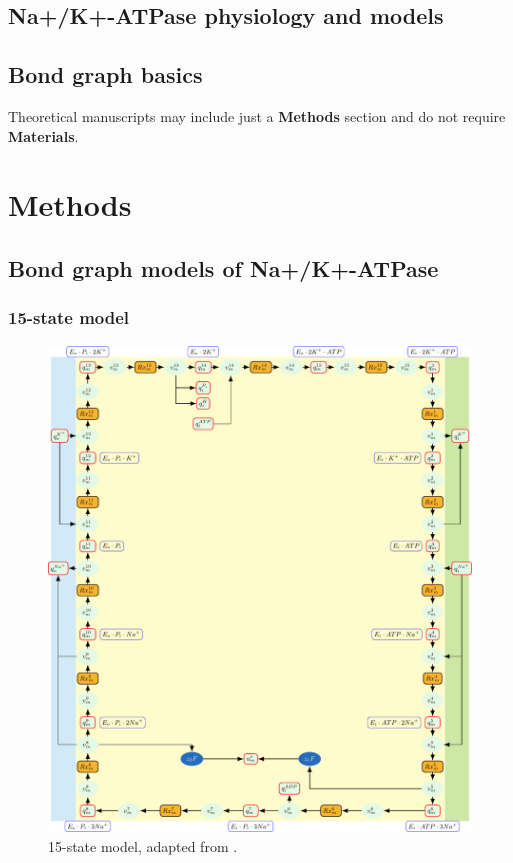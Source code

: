\documentclass{biophys-new}
\begin{document}
\subsection*{Na+/K+-ATPase physiology and models}


\subsection*{Bond graph basics}

Theoretical manuscripts may include just a \textbf{Methods} section and do not require \textbf{Materials}.


\section*{Methods}


\subsection*{Bond graph models of Na+/K+-ATPase}

\subsubsection{15-state model}

\cite{pan_cardiac_2020}


\begin{figure}
\caption{15-state model, adapted from \cite{pan_cardiac_2020}.}
\centering
\includegraphics[width=1\linewidth]{15state.pdf}
\end{figure}
\end{document}
